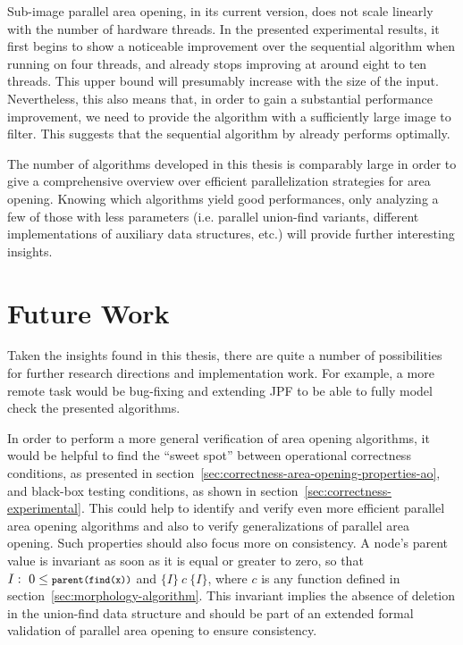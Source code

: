 Sub-image parallel area opening, in its current version, does not scale linearly
with the number of hardware threads. In the presented experimental results, it
first begins to show a noticeable improvement over the sequential algorithm when
running on four threads, and already stops improving at around eight to ten
threads. This upper bound will presumably increase with the size of the
input. Nevertheless, this also means that, in order to gain a substantial
performance improvement, we need to provide the algorithm with a sufficiently
large image to filter. This suggests that the sequential algorithm by
\citet{Meijster2002Comparison} already performs optimally.

The number of algorithms developed in this thesis is comparably large in order
to give a comprehensive overview over efficient parallelization strategies for
area opening. Knowing which algorithms yield good performances, only analyzing a
few of those with less parameters (i.e. parallel union-find variants, different
implementations of auxiliary data structures, etc.) will provide further
interesting insights.

\section{Future Work}
\label{sec:future-work}

Taken the insights found in this thesis, there are quite a number of
possibilities for further research directions and implementation work. For
example, a more remote task would be bug-fixing and extending JPF to be able to
fully model check the presented algorithms.

In order to perform a more general verification of area opening algorithms, it would be
helpful to find the ``sweet spot'' between operational correctness conditions,
as presented in section~\ref{sec:correctness-area-opening-properties-ao}, and
black-box testing conditions, as shown in
section~\ref{sec:correctness-experimental}. This could help to identify and
verify even more efficient parallel area opening algorithms and also to verify
generalizations of parallel area opening. Such properties should also focus more
on consistency. A node's parent value is invariant as soon as it is equal or
greater to zero, so that $I: ~ 0 \leq {\footnotesize\texttt{parent(find(x))}}$ and $\{I\} ~
c ~ \{I\}$, where $c$ is any function defined in
section~\ref{sec:morphology-algorithm}.  This invariant implies the absence of
deletion in the union-find data structure and should be part of an extended
formal validation of parallel area opening to ensure consistency.

